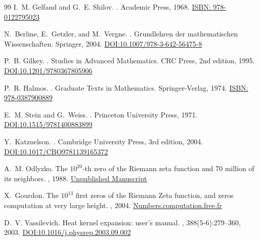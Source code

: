 \documentclass{article}
\numberwithin{equation}{section}
\theoremstyle{plain}
\theoremstyle{definition}
\theoremstyle{remark}
\begin{document}
\begin{thebibliography}{99}
I.~M. Gelfand and G.~E. Shilov.
.
\newblock Academic Press, 1968.
\href{https://archive.org/details/generalizedfunct0000gelf}{ISBN: 978-0122795023}

N.~Berline, E.~Getzler, and M.~Vergne.
.
\newblock Grundlehren der mathematischen Wissenschaften. Springer, 2004.
\href{https://doi.org/10.1007/978-3-642-56475-8}{DOI:10.1007/978-3-642-56475-8}

P.~B. Gilkey.
.
\newblock Studies in Advanced Mathematics. CRC Press, 2nd edition, 1995.
\href{https://doi.org/10.1201/9780367805906}{DOI:10.1201/9780367805906}

P.~R. Halmos.
.
\newblock Graduate Texts in Mathematics. Springer-Verlag, 1974.
\href{https://archive.org/details/measuretheory00halm}{ISBN: 978-0387900889}

E.~M. Stein and G.~Weiss.
.
\newblock Princeton University Press, 1971.
\href{https://doi.org/10.1515/9781400883899}{DOI:10.1515/9781400883899}

Y.~Katznelson.
.
\newblock Cambridge University Press, 3rd edition, 2004.
\href{https://doi.org/10.1017/CBO9781139165372}{DOI:10.1017/CBO9781139165372}

A.~M. Odlyzko.
\newblock The $10^{20}$-th zero of the Riemann zeta function and 70 million of its neighbors.
, 1988.
\href{http://www.dtc.umn.edu/~odlyzko/unpublished/zeta.10to20.1992.pdf}{Unpublished Manuscript}

X.~Gourdon.
\newblock The $10^{13}$ first zeros of the Riemann Zeta function, and zeros computation at very large height.
, 2004.
\href{http://numbers.computation.free.fr/Constants/Miscellaneous/zetazeros1e13-1e24.pdf}{Numbers.computation.free.fr}

D.~V. Vassilevich.
\newblock Heat kernel expansion: user's manual.
, 388(5-6):279--360, 2003.
\href{https://doi.org/10.1016/j.physrep.2003.09.002}{DOI:10.1016/j.physrep.2003.09.002}


\end{thebibliography}
\end{document}
